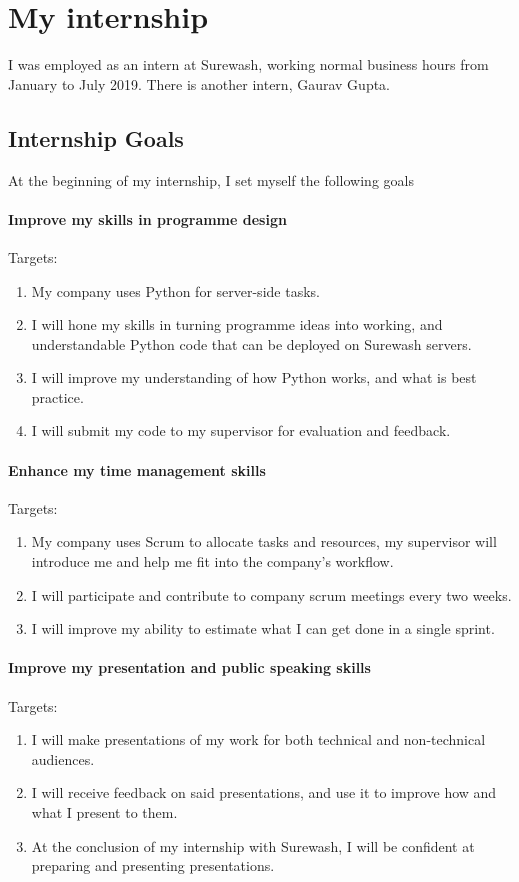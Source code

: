 \section{My internship}
I was employed as an intern at Surewash, working normal business hours from January to July 2019. There is another intern, Gaurav Gupta.
    \subsection{Internship Goals}
    At the beginning of my internship, I set myself the following goals
        \paragraph{Improve my skills in programme design}
        Targets:
        \begin{enumerate}
            \item My company uses Python for server-side tasks.
            \item I will hone my skills in turning programme ideas into working, and understandable Python code that can be deployed on Surewash servers.
            \item I will improve my understanding of how Python works, and what is best practice.
            \item I will submit my code to my supervisor for evaluation and feedback.
        \end{enumerate}
    
        \paragraph{Enhance my time management skills}
        Targets:
        \begin{enumerate}
            \item My company uses Scrum to allocate tasks and resources, my supervisor will introduce me and help me fit into the company’s workflow.
            \item I will participate and contribute to company scrum meetings every two weeks.
            \item I will improve my ability to estimate what I can get done in a single sprint.
        \end{enumerate}

        \paragraph{Improve my presentation and public speaking skills}
        Targets:
        \begin{enumerate}
            \item I will make presentations of my work for both technical and non-technical audiences.
            \item I will receive feedback on said presentations, and use it to improve how and what I present to them.
            \item At the conclusion of my internship with Surewash, I will be confident at preparing and presenting presentations.
        \end{enumerate}